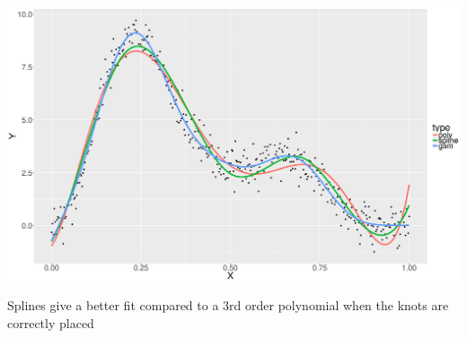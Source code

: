 \documentclass{article}
\begin{document}
\begin{center}
\includegraphics[clip=true, trim=0cm 0cm 0cm 0cm,width=1\textwidth]{./comparaison.eps}
\end{center}


Splines give a better fit compared to a 3rd order polynomial when the knots are correctly placed
\end{document}
